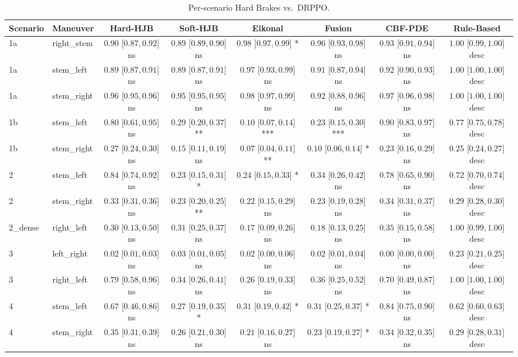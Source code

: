 \begin{table}[ht]
\centering
\caption{Per-scenario Hard Brakes vs.\ DRPPO.}
\label{tab:per_scenario_hard_brakes_per_ep_mean}
\begin{tabular}{llcccccc}
\toprule
Scenario & Maneuver & Hard-HJB & Soft-HJB & Eikonal & Fusion & CBF-PDE & Rule-Based \\
\midrule
1a & right_stem & $0.90$ [$0.87, 0.92$] ns & $0.89$ [$0.89, 0.90$] ns & $0.98$ [$0.97, 0.99$] * & $0.96$ [$0.93, 0.98$] ns & $0.93$ [$0.91, 0.94$] ns & $1.00$ [$0.99, 1.00$] desc \\
1a & stem_left & $0.89$ [$0.87, 0.91$] ns & $0.89$ [$0.87, 0.91$] ns & $0.97$ [$0.93, 0.99$] ns & $0.91$ [$0.87, 0.94$] ns & $0.92$ [$0.90, 0.93$] ns & $1.00$ [$1.00, 1.00$] desc \\
1a & stem_right & $0.96$ [$0.95, 0.96$] ns & $0.95$ [$0.95, 0.95$] ns & $0.98$ [$0.97, 0.99$] ns & $0.92$ [$0.88, 0.96$] ns & $0.97$ [$0.96, 0.98$] ns & $1.00$ [$1.00, 1.00$] desc \\
1b & stem_left & $0.80$ [$0.61, 0.95$] ns & $0.29$ [$0.20, 0.37$] ** & $0.10$ [$0.07, 0.14$] *** & $0.23$ [$0.15, 0.30$] *** & $0.90$ [$0.83, 0.97$] ns & $0.77$ [$0.75, 0.78$] desc \\
1b & stem_right & $0.27$ [$0.24, 0.30$] ns & $0.15$ [$0.11, 0.19$] ns & $0.07$ [$0.04, 0.11$] ** & $0.10$ [$0.06, 0.14$] * & $0.23$ [$0.16, 0.29$] ns & $0.25$ [$0.24, 0.27$] desc \\
2 & stem_left & $0.84$ [$0.74, 0.92$] ns & $0.23$ [$0.15, 0.31$] * & $0.24$ [$0.15, 0.33$] * & $0.34$ [$0.26, 0.42$] ns & $0.78$ [$0.65, 0.90$] ns & $0.72$ [$0.70, 0.74$] desc \\
2 & stem_right & $0.33$ [$0.31, 0.36$] ns & $0.23$ [$0.20, 0.25$] ** & $0.22$ [$0.15, 0.29$] ns & $0.23$ [$0.19, 0.28$] ns & $0.34$ [$0.31, 0.37$] ns & $0.29$ [$0.28, 0.30$] desc \\
2_dense & right_left & $0.30$ [$0.13, 0.50$] ns & $0.31$ [$0.25, 0.37$] ns & $0.17$ [$0.09, 0.26$] ns & $0.18$ [$0.13, 0.25$] ns & $0.35$ [$0.15, 0.58$] ns & $1.00$ [$0.99, 1.00$] desc \\
3 & left_right & $0.02$ [$0.01, 0.03$] ns & $0.03$ [$0.01, 0.05$] ns & $0.02$ [$0.00, 0.06$] ns & $0.02$ [$0.01, 0.04$] ns & $0.00$ [$0.00, 0.00$] ns & $0.23$ [$0.21, 0.25$] desc \\
3 & right_left & $0.79$ [$0.58, 0.96$] ns & $0.34$ [$0.26, 0.41$] ns & $0.26$ [$0.19, 0.33$] ns & $0.36$ [$0.25, 0.52$] ns & $0.70$ [$0.49, 0.87$] ns & $1.00$ [$1.00, 1.00$] desc \\
4 & stem_left & $0.67$ [$0.46, 0.86$] ns & $0.27$ [$0.19, 0.35$] * & $0.31$ [$0.19, 0.42$] * & $0.31$ [$0.25, 0.37$] * & $0.84$ [$0.75, 0.90$] ns & $0.62$ [$0.60, 0.63$] desc \\
4 & stem_right & $0.35$ [$0.31, 0.39$] ns & $0.26$ [$0.21, 0.30$] ns & $0.21$ [$0.16, 0.27$] ns & $0.23$ [$0.19, 0.27$] * & $0.34$ [$0.32, 0.35$] ns & $0.29$ [$0.28, 0.31$] desc \\
\bottomrule
\end{tabular}
\end{table}

